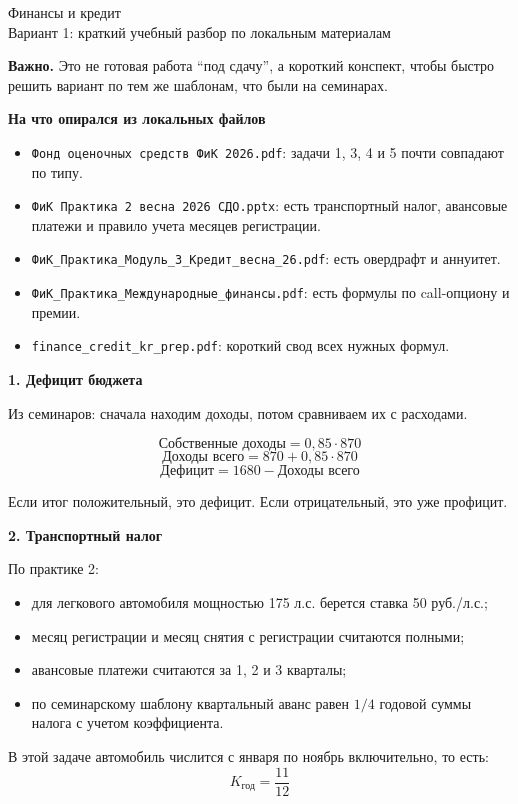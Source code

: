 \documentclass[12pt,a4paper]{article}
\begin{document}
\begin{center}
{\Large Финансы и кредит}\\
{\large Вариант 1: краткий учебный разбор по локальным материалам}
\end{center}

\textbf{Важно.} Это не готовая работа ``под сдачу'', а короткий конспект, чтобы быстро решить вариант по тем же шаблонам, что были на семинарах.

\textbf{На что опирался из локальных файлов}
\begin{itemize}
\item \texttt{Фонд оценочных средств ФиК 2026.pdf}: задачи 1, 3, 4 и 5 почти совпадают по типу.
\item \texttt{ФиК Практика 2 весна 2026 СДО.pptx}: есть транспортный налог, авансовые платежи и правило учета месяцев регистрации.
\item \texttt{ФиК\_Практика\_Модуль\_3\_Кредит\_весна\_26.pdf}: есть овердрафт и аннуитет.
\item \texttt{ФиК\_Практика\_Международные\_финансы.pdf}: есть формулы по call-опциону и премии.
\item \texttt{finance\_credit\_kr\_prep.pdf}: короткий свод всех нужных формул.
\end{itemize}

\textbf{1. Дефицит бюджета}

Из семинаров: сначала находим доходы, потом сравниваем их с расходами.

\[
\text{Собственные доходы} = 0{,}85 \cdot 870
\]
\[
\text{Доходы всего} = 870 + 0{,}85 \cdot 870
\]
\[
\text{Дефицит} = 1680 - \text{Доходы всего}
\]

Если итог положительный, это дефицит. Если отрицательный, это уже профицит.

\textbf{2. Транспортный налог}

По практике 2:
\begin{itemize}
\item для легкового автомобиля мощностью 175 л.с. берется ставка 50 руб./л.с.;
\item месяц регистрации и месяц снятия с регистрации считаются полными;
\item авансовые платежи считаются за 1, 2 и 3 кварталы;
\item по семинарскому шаблону квартальный аванс равен $1/4$ годовой суммы налога с учетом коэффициента.
\end{itemize}

В этой задаче автомобиль числится с января по ноябрь включительно, то есть:
\[
K_{\text{год}}=\frac{11}{12}
\]
\end{document}
